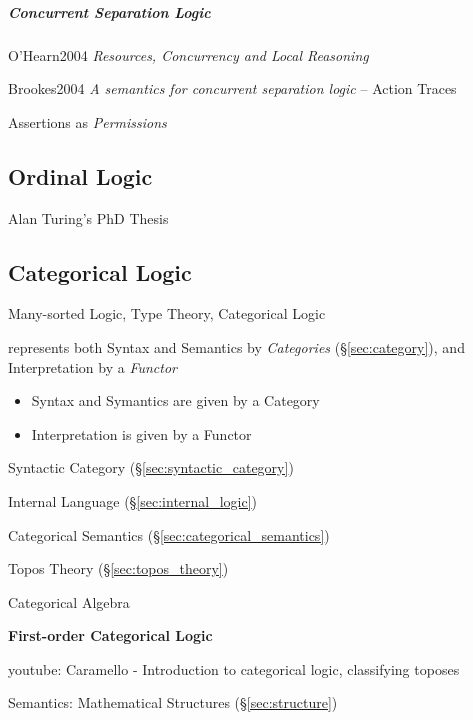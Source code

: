\subparagraph{Concurrent Separation Logic}
\label{sec:concurrent_separation}\hfill

O'Hearn2004 \emph{Resources, Concurrency and Local Reasoning}

Brookes2004 \emph{A semantics for concurrent separation logic} --
Action Traces

Assertions as \emph{Permissions}



\subsection{Ordinal Logic}\label{sec:ordinal_logic}

Alan Turing's PhD Thesis \cite{turing38}



\subsection{Categorical Logic}\label{sec:categorical_logic}

Many-sorted Logic, Type Theory, Categorical Logic

represents both Syntax and Semantics by \emph{Categories}
(\S\ref{sec:category}), and Interpretation by a \emph{Functor}

\begin{itemize}
  \item Syntax and Symantics are given by a Category
  \item Interpretation is given by a Functor
\end{itemize}

Syntactic Category (\S\ref{sec:syntactic_category})

Internal Language (\S\ref{sec:internal_logic})

Categorical Semantics (\S\ref{sec:categorical_semantics})

Topos Theory (\S\ref{sec:topos_theory})

Categorical Algebra


\textbf{First-order Categorical Logic}

youtube: Caramello - Introduction to categorical logic, classifying
toposes

Semantics: Mathematical Structures (\S\ref{sec:structure})

